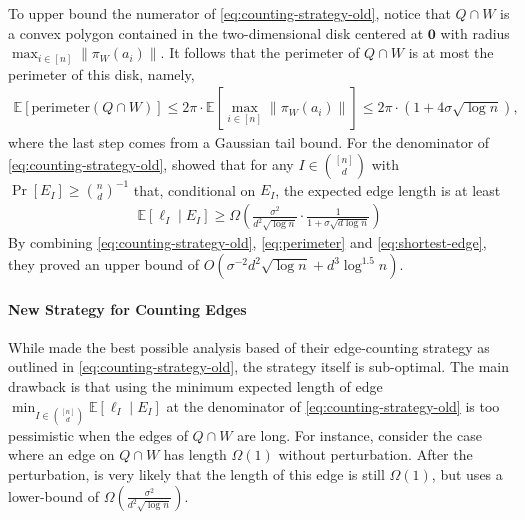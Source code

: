 \documentclass{article}\usepackage[a4paper,margin=20mm]{geometry}
\newcommand{\E}{\mathbb E}
\begin{document}
To upper bound the numerator of \eqref{eq:counting-strategy-old}, notice that $Q \cap W$ is a convex polygon contained in the two-dimensional disk centered at $\mathbf{0}$ with radius $\max_{i \in [n]}\|\pi_W(a_i)\|$. 
It follows that the perimeter of $Q \cap W$ is at most the perimeter of this disk, namely,
\begin{align}
    \E[\mathrm{perimeter}(Q \cap W)] \leq 2\pi \cdot \E[\max_{i \in [n]}\|\pi_W(a_i)\|] \leq 2\pi \cdot (1 + 4\sigma \sqrt{\log n}), \label{eq:perimeter}
\end{align}
where the last step comes from a Gaussian tail bound.
For the denominator of \eqref{eq:counting-strategy-old}, \cite{DH18} showed that for
any $I \in \binom{[n]}{d}$ with $\Pr[E_I] \geq \binom n d ^{-1}$ that, conditional on $E_I$, the expected edge length is at least
\begin{align}
    \E[\ell_I \mid E_I] \geq \Omega(\frac{\sigma^2}{d^2 \sqrt{\log n}} \cdot \frac{1}{1 + \sigma \sqrt{d \log n}}) \label{eq:shortest-edge}
\end{align}
By combining \eqref{eq:counting-strategy-old}, \eqref{eq:perimeter} and \eqref{eq:shortest-edge}, they proved an upper bound of $O(\sigma^{-2} d^2 \sqrt{\log n} + d^3 \log^{1.5}n)$.

\paragraph{New Strategy for Counting Edges}

While \cite{DH18} made the best possible analysis based of their edge-counting strategy as outlined in \eqref{eq:counting-strategy-old}, the strategy itself is sub-optimal.
The main drawback is that using the minimum expected length of edge $\min_{I \in \binom{[n]}{d}} \E[\ell_I \mid E_I]$ at the denominator of \eqref{eq:counting-strategy-old} is too pessimistic when the edges of $Q \cap W$ are long.
For instance, consider the case where an edge on $Q \cap W$ has length $\Omega(1)$ without perturbation. 
After the perturbation, is very likely that the length of this edge is still $\Omega(1)$, but \cite{DH18} uses a lower-bound of $\Omega(\frac{\sigma^2}{d^2 \sqrt{\log n}})$.
\end{document}

